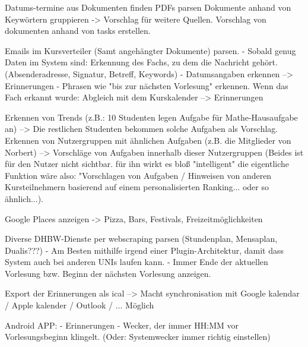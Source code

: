 Datums-termine aus Dokumenten finden %
PDFs parsen %
Dokumente anhand von Keywörtern gruppieren -> Vorschlag für weitere Quellen. %
Vorschlag von dokumenten anhand von tasks erstellen. %

Emails im Kursverteiler (Samt angehängter Dokumente) parsen. %
    - Sobald genug Daten im System sind: Erkennung des Fachs, zu dem die Nachricht gehört. (Absenderadresse, Signatur, Betreff, Keywords) %
    - Datumsangaben erkennen --> Erinnerungen %
    - Phrasen wie "bis zur nächsten Vorlesung" erkennen. Wenn das Fach erkannt wurde: Abgleich mit dem Kurskalender --> Erinnerungen %

Erkennen von Trends (z.B.: 10 Studenten legen Aufgabe für Mathe-Hausaufgabe an)
    --> Die restlichen Studenten bekommen solche Aufgaben als Vorschlag. %
Erkennen von Nutzergruppen mit ähnlichen Aufgaben (z.B. die Mitglieder von Norbert)
    --> Vorschläge von Aufgaben innerhalb dieser Nutzergruppen %
(Beides ist für den Nutzer nicht sichtbar. für ihn wirkt es bloß "intelligent" die eigentliche 
Funktion wäre also: "Vorschlagen von Aufgaben / Hinweisen von anderen Kursteilnehmern basierend
auf einem personalisierten Ranking... oder so ähnlich...).

Google Places anzeigen -> Pizza, Bars, Festivals, Freizeitmöglichkeiten %

Diverse DHBW-Dienste per webscraping parsen (Stundenplan, Mensaplan, Dualis???) - Am Besten mithilfe irgend einer Plugin-Architektur, damit dass System auch bei anderen UNIs laufen kann.
    - Immer Ende der aktuellen Vorlesung bzw. Beginn der nächsten Vorlesung anzeigen.


Export der Erinnerungen als ical --> Macht synchronisation mit Google kalendar / Apple kalender / Outlook / ... Möglich %

Android APP: %
    - Erinnerungen
    - Wecker, der immer HH:MM vor Vorlesungsbeginn klingelt. (Oder: Systemwecker immer richtig einstellen)

